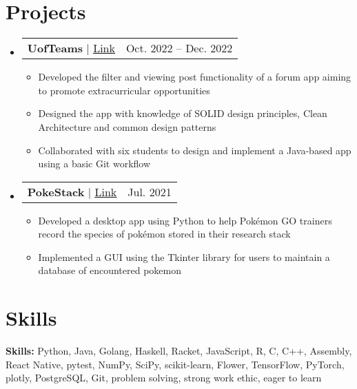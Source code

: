 \documentclass[letterpaper,11pt]{article}
\makeatletter
\newcommand{\resumeItem}[1]{
  \item\small{
    {#1 \vspace{-2pt}}
  }
}
\newcommand{\resumeProjectHeading}[2]{
    \item
    \begin{tabular*}{0.97\textwidth}{l@{\extracolsep{\fill}}r}
      \small#1 & #2 \\
    \end{tabular*}\vspace{-7pt}
}
\newcommand{\resumeSubHeadingListStart}{\begin{itemize}[leftmargin=0.15in, label={}]}
\newcommand{\resumeSubHeadingListEnd}{\end{itemize}}
\newcommand{\resumeItemListStart}{\begin{itemize}}
\newcommand{\resumeItemListEnd}{\end{itemize}\vspace{-5pt}}
\makeatother
\begin{document}
\section{Projects}
    \resumeSubHeadingListStart
      \resumeProjectHeading
        {\textbf{UofTeams} $|$
        \href{https://github.com/CSC207-2022F-UofT/course-project-uofteams}{\underline{Link}}}{Oct. 2022 -- Dec. 2022}
        \resumeItemListStart
            \resumeItem{Developed the filter and viewing post functionality of a forum app aiming to promote extracurricular opportunities}
            \resumeItem{Designed the app with knowledge of SOLID design principles, Clean Architecture and common design patterns}
            \resumeItem{Collaborated with six students to design and implement a Java-based app using a basic Git workflow}
        \resumeItemListEnd
      \resumeProjectHeading
          {\textbf{PokeStack} $|$ \href{https://github.com/sushimon/PokeStack}{\underline{Link}}}{Jul. 2021}
          \resumeItemListStart
            \resumeItem{Developed a desktop app using Python to help Pokémon GO trainers record the species of pokémon stored in their research stack}
            \resumeItem{Implemented a GUI using the Tkinter library for users to maintain a database of encountered pokemon}
          \resumeItemListEnd
    \resumeSubHeadingListEnd

\section{Skills} %
 \begin{itemize}[leftmargin=0.15in, label={}]
    \small{\item{
     \textbf{Skills:}{ Python, Java, Golang, Haskell, Racket, JavaScript, R, C, C++, Assembly, React Native, pytest, NumPy, SciPy,
scikit-learn, Flower, TensorFlow, PyTorch, plotly, PostgreSQL, Git, problem solving, strong work ethic, eager to learn} \\
    }}
 \end{itemize}
\end{document}

